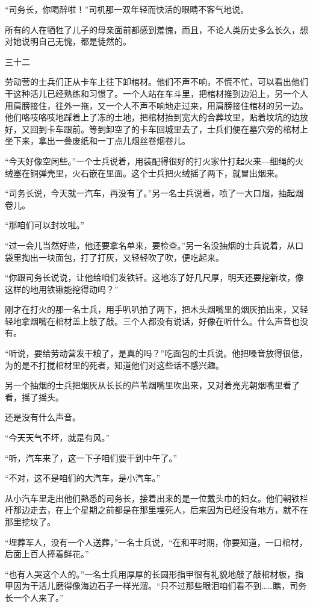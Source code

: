 “司务长，你喝醉啦！”司机那一双年轻而快活的眼睛不客气地说。

所有的人在牺牲了儿子的母亲面前都感到羞愧，而且，不论人类历史多么长久，想对她说明自己无愧，都是徒然的。

三十二

劳动营的士兵们正从卡车上往下卸棺材。他们不声不响，不慌不忙，可以看出他们干这种活儿已经熟练和习惯了。一个人站在车斗里，把棺材推到边沿上，另一个人用肩膀接住，往外一拖，又一个人不声不响地走过来，用肩膀接住棺材的另一边。他们咯吱咯吱地踩着上了冻的土地，把棺材抬到宽大的合葬坟里，贴着坟坑的边放好，又回到卡车跟前。等到卸空了的卡车回城里去了，士兵们便在墓穴旁的棺材上坐下来，拿出一叠废纸和一丁点儿烟丝卷烟卷儿。

“今天好像空闲些。”一个士兵说着，用装配得很好的打火家什打起火来—细绳的火绒塞在铜弹壳里，火石嵌在里面。这个士兵把火绒摇了两下，就冒出烟来。

“司务长说，今天就一汽车，再没有了。”另一名士兵说着，喷了一大口烟，抽起烟卷儿。

“那咱们可以封坟啦。”

“过一会儿当然好些，他还要拿名单来，要检查。”另一名没抽烟的士兵说着，从口袋里掏出一块面包，打了打灰，又轻轻吹了吹，便吃起来。

“你跟司务长说说，让他给咱们发铁钎。这地冻了好几尺厚，明天还要挖新坟，像这样的地用铁锹能挖得动吗？”

刚才在打火的那一名士兵，用手叭叭拍了两下，把木头烟嘴里的烟灰拍出来，又轻轻地拿烟嘴在棺材盖上敲了敲。三个人都没有说话，好像在听什么。什么声音也没有。

“听说，要给劳动营发干粮了，是真的吗？”吃面包的士兵说。他把嗓音放得很低，为的是不打搅棺材里的死者，知道他们对这些话不感兴趣。

另一个抽烟的士兵把烟灰从长长的芦苇烟嘴里吹出来，又对着亮光朝烟嘴里看了看，摇了摇头。

还是没有什么声音。

“今天天气不坏，就是有风。”

“听，汽车来了，这一下子咱们要干到中午了。”

“不对，这不是咱们的大汽车，是小汽车。”

从小汽车里走出他们熟悉的司务长，接着出来的是一位戴头巾的妇女。他们朝铁栏杆那边走去，在上个星期之前都是在那里埋死人，后来因为已经没有地方，就不在那里挖坟了。

“埋葬军人，没有一个人送葬，”一名士兵说，“在和平时期，你要知道，一口棺材，后面上百人捧着鲜花。”

“也有人哭这个人的。”一名士兵用厚厚的长圆形指甲很有礼貌地敲了敲棺材板，指甲因为干活儿磨得像海边石子一样光溜。“只不过那些眼泪咱们看不到……瞧，司务长一个人来了。”

